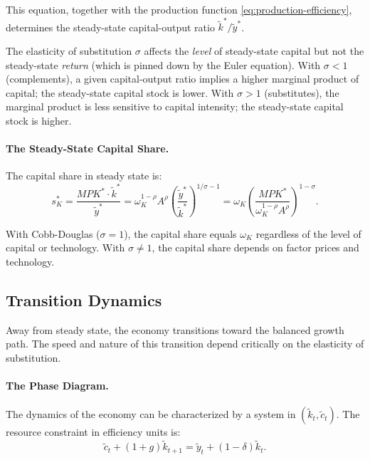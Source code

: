 This equation, together with the production function \cref{eq:production-efficiency}, determines the steady-state capital-output ratio $\tilde{k}^*/\tilde{y}^*$.

\begin{calloutnote}
The elasticity of substitution $\sigma$ affects the \emph{level} of steady-state capital but not the steady-state \emph{return} (which is pinned down by the Euler equation). With $\sigma < 1$ (complements), a given capital-output ratio implies a higher marginal product of capital; the steady-state capital stock is lower. With $\sigma > 1$ (substitutes), the marginal product is less sensitive to capital intensity; the steady-state capital stock is higher.
\end{calloutnote}

\paragraph{The Steady-State Capital Share.}
The capital share in steady state is:
\begin{equation}
s_K^* = \frac{MPK^* \cdot \tilde{k}^*}{\tilde{y}^*} = \omega_K^{1-\rho} A^\rho \left( \frac{\tilde{y}^*}{\tilde{k}^*} \right)^{1/\sigma - 1} = \omega_K \left( \frac{MPK^*}{\omega_K^{1-\rho} A^\rho} \right)^{1 - \sigma}.
\label{eq:capital-share-steady}
\end{equation}

With Cobb-Douglas ($\sigma = 1$), the capital share equals $\omega_K$ regardless of the level of capital or technology. With $\sigma \neq 1$, the capital share depends on factor prices and technology.

\subsection{Transition Dynamics}
\label{subsec:transition-dynamics}

Away from steady state, the economy transitions toward the balanced growth path. The speed and nature of this transition depend critically on the elasticity of substitution.

\paragraph{The Phase Diagram.}
The dynamics of the economy can be characterized by a system in $(\tilde{k}_t, \tilde{c}_t)$. The resource constraint in efficiency units is:
\begin{equation}
\tilde{c}_t + (1+g) \tilde{k}_{t+1} = \tilde{y}_t + (1-\delta) \tilde{k}_t.
\label{eq:resource-efficiency}
\end{equation}

